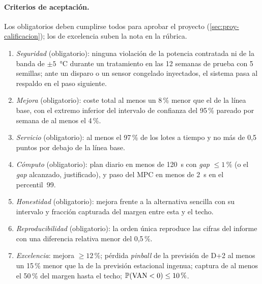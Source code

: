 \paragraph{Criterios de aceptación.} Los obligatorios deben cumplirse todos para aprobar el proyecto (\cref{sec:proy-calificacion}); los de excelencia suben la nota en la rúbrica.
\begin{enumerate}[label=A\arabic*.]
  \item \emph{Seguridad} (obligatorio): ninguna violación de la potencia contratada ni de la banda de $\pm5$~°C durante un tratamiento en las 12 semanas de prueba con 5 semillas; ante un disparo o un sensor congelado inyectados, el sistema pasa al respaldo en el paso siguiente.
  \item \emph{Mejora} (obligatorio): coste total al menos un 8\,\% menor que el de la línea base, con el extremo inferior del intervalo de confianza del 95\,\% pareado por semana de al menos el 4\,\%.
  \item \emph{Servicio} (obligatorio): al menos el 97\,\% de los lotes a tiempo y no más de 0{,}5 puntos por debajo de la línea base.
  \item \emph{Cómputo} (obligatorio): plan diario en menos de 120~s con \emph{gap} $\le 1\,\%$ (o el \emph{gap} alcanzado, justificado), y paso del MPC en menos de 2~s en el percentil~99.
  \item \emph{Honestidad} (obligatorio): mejora frente a la alternativa sencilla con su intervalo y fracción capturada del margen entre esta y el techo.
  \item \emph{Reproducibilidad} (obligatorio): la orden única reproduce las cifras del informe con una diferencia relativa menor del 0{,}5\,\%.
  \item \emph{Excelencia}: mejora $\ge 12\,\%$; pérdida \emph{pinball} de la previsión de D+2 al menos un 15\,\% menor que la de la previsión estacional ingenua; captura de al menos el 50\,\% del margen hasta el techo; $\mathbb{P}(\mathrm{VAN}<0)\le 10\,\%$.
\end{enumerate}

